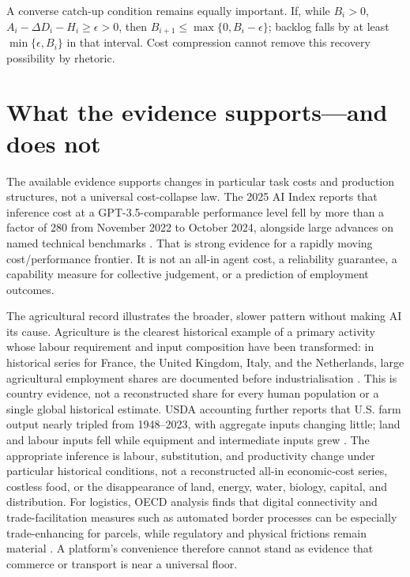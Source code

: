 \documentclass[11pt]{article}
\begin{document}
A converse catch-up condition remains equally important. If, while $B_i>0$,
$A_i-\Delta D_i-H_i\geq\epsilon>0$, then
$B_{i+1}\leq\max\{0,B_i-\epsilon\}$; backlog falls by at least
$\min\{\epsilon,B_i\}$ in that interval. Cost compression cannot remove this
recovery possibility by rhetoric.

\section{What the evidence supports---and does not}\label{sec:evidence}

The available evidence supports changes in particular task costs and production
structures, not a universal cost-collapse law. The 2025 AI Index reports that
inference cost at a GPT-3.5-comparable performance level fell by more than a
factor of 280 from November 2022 to October 2024, alongside large advances on
named technical benchmarks \citep{stanford2025}. That is strong evidence for a
rapidly moving cost/performance frontier. It is not an all-in agent cost, a
reliability guarantee, a capability measure for collective judgement, or a
prediction of employment outcomes.

The agricultural record illustrates the broader, slower pattern without making
AI its cause. Agriculture is the clearest historical example of a primary
activity whose labour requirement and input composition have been transformed:
in historical series for France, the United Kingdom, Italy, and the Netherlands,
large agricultural employment shares are documented before industrialisation \citep{owidag2026}. This is country evidence, not a reconstructed
share for every human population or a single global historical estimate. USDA
accounting further reports that U.S. farm output nearly tripled from 1948--2023,
with aggregate inputs changing little; land and labour inputs fell while
equipment and intermediate inputs grew \citep{usda2026}. The appropriate
inference is labour, substitution, and productivity change under particular
historical conditions, not a reconstructed all-in economic-cost series,
costless food, or the disappearance of land, energy, water, biology, capital,
and distribution. For logistics, OECD analysis finds that
digital connectivity and trade-facilitation measures such as automated border
processes can be especially trade-enhancing for parcels, while regulatory and
physical frictions remain material \citep{oecd2021,oecd2025}. A platform's
convenience therefore cannot stand as evidence that commerce or transport is
near a universal floor.
\end{document}
